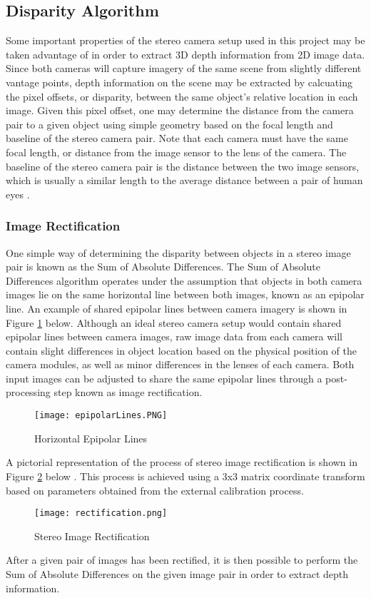 \subsection{Disparity Algorithm}
Some important properties of the stereo camera setup used in this project may be taken advantage of in order to extract 3D depth information from 2D image data. Since both cameras will capture imagery of the same scene from slightly different vantage points, depth information on the scene may be extracted by calcuating the pixel offsets, or disparity, between the same object's relative location in each image. Given this pixel offset, one may determine the distance from the camera pair to a given object using simple geometry based on the focal length and baseline of the stereo camera pair. Note that each camera must have the same focal length, or distance from the image sensor to the lens of the camera. The baseline of the stereo camera pair is the distance between the two image sensors, which is usually a similar length to the average distance between a pair of human eyes  \cite{collins}. 
\subsubsection{Image Rectification} \label{rectsec}One simple way of determining the disparity between objects in a stereo image pair is known as the Sum of Absolute Differences. The Sum of Absolute Differences algorithm operates under the assumption that objects in both camera images lie on the same horizontal line between both images, known as an epipolar line. An example of shared epipolar lines between camera imagery is shown in Figure \ref{epipolarLines} below. Although an ideal stereo camera setup would contain shared epipolar lines between camera images, raw image data from each camera will contain slight differences in object location based on the physical position of the camera modules, as well as minor differences in the lenses of each camera. Both input images can be adjusted to share the same epipolar lines through a post-processing step known as image rectification. 
\par
\begin{figure}[H]
	\centerline{\texttt{[image: epipolarLines.PNG]}}
	\caption{Horizontal Epipolar Lines \cite{collins}}
	\label{epipolarLines}
\end{figure}
\par
A pictorial representation of the process of stereo image rectification is shown in Figure \ref{rectification} below \cite{mattoccia_slides}. This process is achieved using a 3x3 matrix coordinate transform based on parameters obtained from the external calibration process. 
\begin{figure}[H]
	\centerline{\texttt{[image: rectification.png]}}
	\caption{Stereo Image Rectification \cite{mattoccia_slides}}
	\label{rectification}
\end{figure}
\par
After a given pair of images has been rectified, it is then possible to perform the Sum of Absolute Differences on the given image pair in order to extract depth information. 
